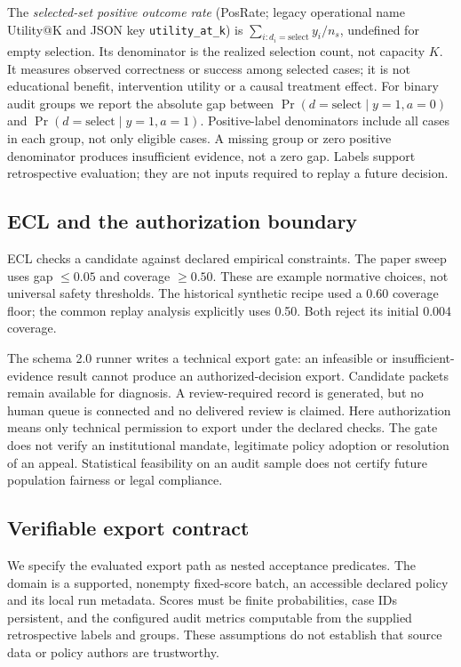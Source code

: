 The \emph{selected-set positive outcome rate} (PosRate; legacy operational name Utility@K and JSON key \texttt{utility\_at\_k}) is $\sum_{i:d_i=\mathrm{select}}y_i/n_s$, undefined for empty selection. Its denominator is the realized selection count, not capacity $K$. It measures observed correctness or success among selected cases; it is not educational benefit, intervention utility or a causal treatment effect. For binary audit groups we report the absolute gap between $\Pr(d=\mathrm{select}\mid y=1,a=0)$ and $\Pr(d=\mathrm{select}\mid y=1,a=1)$. Positive-label denominators include all cases in each group, not only eligible cases. A missing group or zero positive denominator produces insufficient evidence, not a zero gap. Labels support retrospective evaluation; they are not inputs required to replay a future decision.

\subsection{ECL and the authorization boundary}
\label{sec:ecl}
ECL checks a candidate against declared empirical constraints. The paper sweep uses gap $\leq0.05$ and coverage $\geq0.50$. These are example normative choices, not universal safety thresholds. The historical synthetic recipe used a 0.60 coverage floor; the common replay analysis explicitly uses 0.50. Both reject its initial 0.004 coverage.

The schema 2.0 runner writes a technical export gate: an infeasible or insufficient-evidence result cannot produce an authorized-decision export. Candidate packets remain available for diagnosis. A review-required record is generated, but no human queue is connected and no delivered review is claimed. Here authorization means only technical permission to export under the declared checks. The gate does not verify an institutional mandate, legitimate policy adoption or resolution of an appeal. Statistical feasibility on an audit sample does not certify future population fairness or legal compliance.

\subsection{Verifiable export contract}
\label{sec:export-contract}
We specify the evaluated export path as nested acceptance predicates. The domain is a supported, nonempty fixed-score batch, an accessible declared policy and its local run metadata. Scores must be finite probabilities, case IDs persistent, and the configured audit metrics computable from the supplied retrospective labels and groups. These assumptions do not establish that source data or policy authors are trustworthy.

